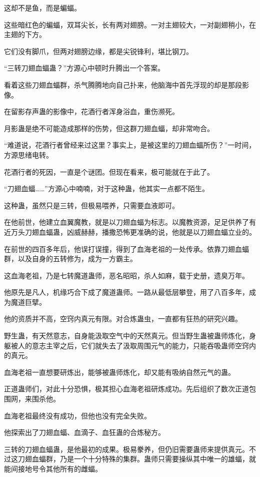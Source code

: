 \begin{this_body}
这却不是鱼，而是蝙蝠。

这些暗红色的蝙蝠，双耳尖长，长有两对翅膀。一对主翅较大，一对副翅稍小，在主翅的下方。

它们没有脚爪，但两对翅膀边缘，都是尖锐锋利，堪比钢刀。

“三转刀翅血蝠蛊？”方源心中顿时升腾出一个答案。

看着这些刀翅血蝠群，杀气腾腾地向自己扑来，他脑海中首先浮现的却是那段影像。

在留影存声蛊的影像中，花酒行者浑身浴血，重伤濒死。

月影蛊是绝不可能造成那样的伤势，但这群刀翅血蝠，却非常吻合。

“难道说，花酒行者曾经来过这里？事实上，是被这里的刀翅血蝠所伤？”一时间，方源思绪电转。

花酒行者的死因，一直是个谜团。但现在看来，极可能就在于此了。

“刀翅血蝠……”方源心中喃喃，对于这种蛊，他其实一点都不陌生。

这种蛊，虽然只是三转，但极易喂养，只需要血液即可。

在他前世，他建立血翼魔教，就是以刀翅血蝠为标志。以魔教资源，足足供养了有近万头刀翅血蝠蛊，凶威赫赫，播撒恐怖更准确的说，他就是以刀翅血蝠立业的。

在前世的四百多年后，他误打误撞，得到了血海老祖的一处传承。依靠刀翅血蝠群，以及自身的五转修为，成为一方霸主。

这血海老祖，乃是七转魔道蛊师，恶名昭昭，杀人如麻，载于史册，遗臭万年。

他原先是凡人，机缘巧合下成了魔道蛊师。一路从最低层攀登，用了八百多年，成为魔道巨擘。

他的资质并不高，空窍内真元有限。对合炼蛊虫，一直都有狂热的研究兴趣。

野生蛊，有天然意志，自身能汲取空气中的天然真元。但当野生蛊被蛊师炼化，身躯被人的意志主宰之后，它们就失去了汲取周围元气的能力，只能吞吸蛊师空窍内的真元。

血海老祖一直想要研炼出，能够被蛊师炼化，却又能有吸纳自然元气的蛊。

正道蛊师们，对此十分恐惧，极其担心血海老祖研炼成功。先后组织了数次正道包围网，来围杀他。

血海老祖最终没有成功，但他也没有完全失败。

他探索出了刀翅血蝠、血滴子、血狂蛊的合炼秘方。

三转的刀翅血蝠蛊，是他最初的成果。极易豢养，但仍旧需要蛊师来提供真元。不过这刀翅血蝠群，乃是一个十分特殊的集群。蛊师只需要操纵其中唯一的雄蝠，就能间接地号令其他所有的雌蝠。


\end{this_body}
